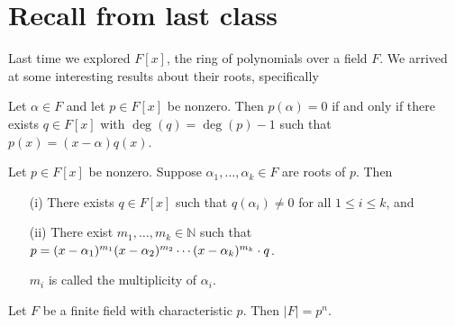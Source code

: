 
\section{Recall from last class}
Last time we explored \(F[x]\), the ring of polynomials over a field \(F\). We arrived at some interesting results about their roots, specifically
\begin{lemma}[Descartes]
    Let \(\alpha  \in F\) and let \(p \in F[x]\) be nonzero. Then \(p(\alpha )=0\) if and only if there exists \(q \in F[x]\) with \(\deg(q)=\deg(p)-1\) such that \(p(x)=(x-\alpha )q(x)\).
\end{lemma} 
\begin{corollary}[\textcolor{green}{still ask sarah, can't we just take \(q=1\), what are we really saying here?}]
    Let \(p \in F[x]\) be nonzero. Suppose \(\alpha_1 , \dots , \alpha _k \in F\) are roots of \(p\). Then
    \begin{itemize}
        \item[(i)] There exists \(q \in F[x]\) such that \(q(\alpha _i) \neq 0\) for all \(1\leq i\leq k\), and
        \item[(ii)] There exist \(m_1, \dots , m_k \in \mathbb{N} \) such that \(p = (x-\alpha _1)^{m_1}(x-\alpha _2)^{m_2} \cdots \\ (x-\alpha _k)^{m_k} \cdot q\).
        \begin{remark}
            \(m_i\) is called the multiplicity of \(\alpha _i\).
        \end{remark}
    \end{itemize}   
\end{corollary}
\begin{fact}
    Let \(F\) be a finite field with characteristic \(p\). Then \(\vert F \vert = p^n \).
\end{fact}

